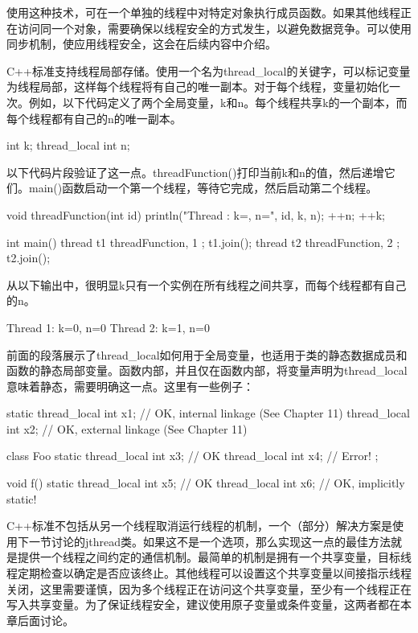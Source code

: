 使用这种技术，可在一个单独的线程中对特定对象执行成员函数。如果其他线程正在访问同一个对象，需要确保以线程安全的方式发生，以避免数据竞争。可以使用同步机制，使应用线程安全，这会在后续内容中介绍。


C++标准支持线程局部存储。使用一个名为thread\_local的关键字，可以标记变量为线程局部，这样每个线程将有自己的唯一副本。对于每个线程，变量初始化一次。例如，以下代码定义了两个全局变量，k和n。每个线程共享k的一个副本，而每个线程都有自己的n的唯一副本。

\begin{cpp}
int k;
thread_local int n;
\end{cpp}

以下代码片段验证了这一点。threadFunction()打印当前k和n的值，然后递增它们。main()函数启动一个第一个线程，等待它完成，然后启动第二个线程。

\begin{cpp}
void threadFunction(int id)
{
    println("Thread {}: k={}, n={}", id, k, n);
    ++n;
    ++k;
}

int main()
{
    thread t1 { threadFunction, 1 }; t1.join();
    thread t2 { threadFunction, 2 }; t2.join();
}
\end{cpp}

从以下输出中，很明显k只有一个实例在所有线程之间共享，而每个线程都有自己的n。

\begin{shell}
Thread 1: k=0, n=0
Thread 2: k=1, n=0
\end{shell}

前面的段落展示了thread\_local如何用于全局变量，也适用于类的静态数据成员和函数的静态局部变量。函数内部，并且仅在函数内部，将变量声明为thread\_local意味着静态，需要明确这一点。这里有一些例子：

\begin{cpp}
static thread_local int x1; // OK, internal linkage (See Chapter 11)
thread_local int x2; // OK, external linkage (See Chapter 11)

class Foo
{
    static thread_local int x3; // OK
    thread_local int x4; // Error!
};

void f()
{
    static thread_local int x5; // OK
    thread_local int x6; // OK, implicitly static!
}
\end{cpp}


C++标准不包括从另一个线程取消运行线程的机制，一个（部分）解决方案是使用下一节讨论的jthread类。如果这不是一个选项，那么实现这一点的最佳方法就是提供一个线程之间约定的通信机制。最简单的机制是拥有一个共享变量，目标线程定期检查以确定是否应该终止。其他线程可以设置这个共享变量以间接指示线程关闭，这里需要谨慎，因为多个线程正在访问这个共享变量，至少有一个线程正在写入共享变量。为了保证线程安全，建议使用原子变量或条件变量，这两者都在本章后面讨论。

